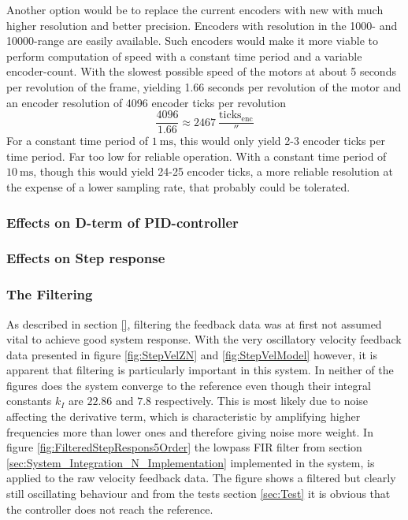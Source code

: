 \documentclass[../../main.tex]{subfiles}
\begin{document}
Another option would be to replace the current encoders with new with much higher resolution and better precision. Encoders with resolution in the 1000- and 10000-range are easily available. Such encoders would make it more viable to perform computation of speed with a constant time period and a variable encoder-count. With the slowest possible speed of the motors at about 5 seconds per revolution of the frame, yielding 1.66 seconds per revolution of the motor and an encoder resolution of 4096 encoder ticks per revolution 
\begin{equation}
    \frac{4096}{1.66} \approx \SI{ 2467 }{ \frac{ \mathrm{ ticks_{enc} } }{ \second } } 
\end{equation}
For a constant time period of $\SI{ 1 }{ \milli \second }$, this would only yield 2-3 encoder ticks per time period. Far too low for reliable operation. With a constant time period of $\SI{ 10 }{ \milli \second }$, though this would yield 24-25 encoder ticks, a more reliable resolution at the expense of a lower sampling rate, that probably could be tolerated.

\subsubsection*{Effects on D-term of PID-controller}

\subsubsection*{Effects on Step response}

\subsubsection*{The Filtering}
As described in section \ref{}, filtering the feedback data was at first not assumed vital to achieve good system response. With the very oscillatory velocity feedback data presented in figure \ref{fig:StepVelZN} and \ref{fig:StepVelModel} however, it is apparent that filtering is particularly important in this system. In neither of the figures does the system converge to the reference even though their integral constants $k_I$ are $22.86$ and $7.8$ respectively. This is most likely due to noise affecting the derivative term, which is characteristic by amplifying higher frequencies more than lower ones and therefore giving noise more weight. In figure \ref{fig:FilteredStepRespons5Order} the lowpass FIR filter from section \ref{sec:System_Integration_N_Implementation} implemented in the system, is applied to the raw velocity feedback data. The figure shows a filtered but clearly still oscillating behaviour and from the tests section \ref{sec:Test} it is obvious that the controller does not reach the reference.\\
\end{document}
